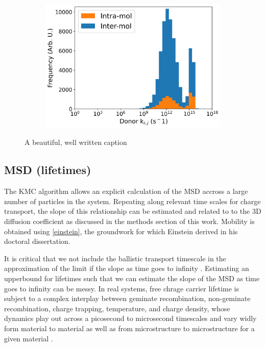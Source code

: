 \begin{figure}
\begin{subfigure}{.5\textwidth}
    \includegraphics[width=\textwidth]{figures/donor_hopping_rate_clusters_temp800.png}
\end{subfigure}
\caption{A beautiful, well written caption}
\label{TEMP}
\end{figure}

\subsection{MSD (lifetimes)}

The KMC algorithm allows an explicit calculation of the MSD accross a large number of 
particles in the system. Repeating along relevant time scales for 
charge transport, the slope of this relationship
can be estimated and related to to the 3D diffusion coefficient as discussed in the methods section of this
work. Mobility is obtained using \autoref{einstein}, 
the groundwork for which Einstein derived in his doctoral dissertation.

It is critical that we not include the ballistic transport timescale in the approximation of the limit
if the slope as time goes to infinity \cite{Maginn2018}. Estimating an upperbound for lifetimes such that
we can estimate the slope of the MSD as time goes to infinity can be messy. In real systems, free chrage
carrier lifetime is subject to a complex interplay between geminate recombination, non-geminate recombination,
charge trapping, temperature, and charge density, whose dynamics play out across a picosecond to microsecond
timescales and vary widly form material to material as well as from microstructure to microstructure for a
given material \cite{Laquai2015}.

